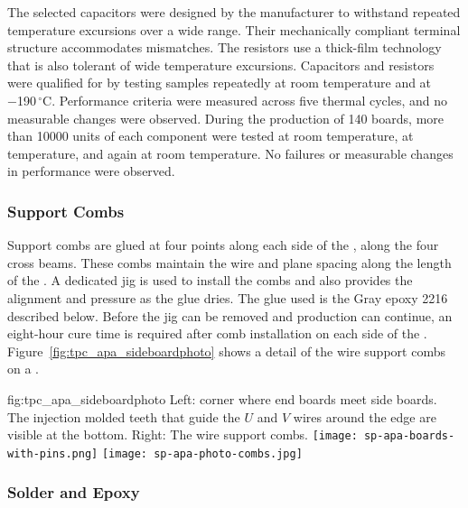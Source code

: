 The selected capacitors were designed by the manufacturer to withstand repeated temperature excursions over a wide range. Their mechanically compliant terminal structure accommodates  mismatches. The resistors use a thick-film technology that is also tolerant of wide temperature excursions.  Capacitors and resistors were qualified for  by testing samples repeatedly at room temperature and at \num{-190}\,$^\circ$C.  Performance criteria were measured across five thermal cycles, and no measurable changes were observed. During the production of \num{140}  boards, more than \num{10000} units of each component were tested at room temperature, at  temperature, and again at room temperature. No failures or measurable changes in performance were observed.




\subsubsection{Support Combs}
\label{sec:combs}

Support combs are glued at four points along each side of the , along the four cross beams. These combs maintain the wire and plane spacing along the length of the . A dedicated jig is used to install the combs and also provides the alignment and pressure as the glue dries. The glue used is the Gray epoxy \num{2216} described below. Before the jig can be removed and production can continue, an eight-hour cure time is required after comb installation on each side of the .  Figure~\ref{fig:tpc_apa_sideboardphoto} shows a detail of the wire support combs on a  .

\begin{dunefigure}{fig:tpc_apa_sideboardphoto}
{Left:  corner where end boards meet side boards.  The injection molded teeth that guide the $U$ and $V$ wires around the edge are visible at the bottom. Right: The wire support combs.}
\texttt{[image: sp-apa-boards-with-pins.png]} \quad
\texttt{[image: sp-apa-photo-combs.jpg]}
\end{dunefigure}

\subsubsection{Solder and Epoxy}
\label{sec:glue-solder}

